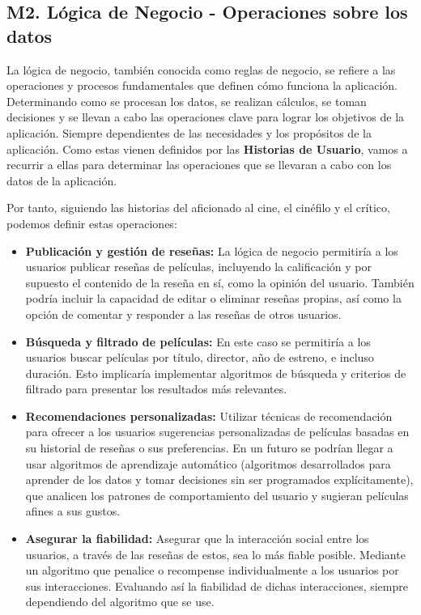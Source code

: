 \subsection{M2. Lógica de Negocio - Operaciones sobre los datos}

La lógica de negocio, también conocida como reglas de negocio, se refiere a las operaciones y procesos fundamentales que definen cómo funciona la aplicación. Determinando como se procesan los datos, se realizan cálculos, se toman decisiones y se llevan a cabo las operaciones clave para lograr los objetivos de la aplicación. Siempre dependientes de las necesidades y los propósitos de la aplicación. Como estas vienen definidos por las \textbf{Historias de Usuario}, vamos a recurrir a ellas para determinar las operaciones que se llevaran a cabo con los datos de la aplicación. 

Por tanto, siguiendo las historias del aficionado al cine, el cinéfilo y el crítico, podemos definir estas operaciones:

\begin{itemize}
\item \textbf{Publicación y gestión de reseñas:} La lógica de negocio permitiría a los usuarios publicar reseñas de películas, incluyendo la calificación y por supuesto el contenido de la reseña en sí, como la opinión del usuario. También podría incluir la capacidad de editar o eliminar reseñas propias, así como la opción de comentar y responder a las reseñas de otros usuarios.
\item \textbf{Búsqueda y filtrado de películas:} En este caso se permitiría a los usuarios buscar películas por título, director, año de estreno, e incluso duración. Esto implicaría implementar algoritmos de búsqueda y criterios de filtrado para presentar los resultados más relevantes. 
\item \textbf{Recomendaciones personalizadas:} Utilizar técnicas de recomendación para ofrecer a los usuarios sugerencias personalizadas de películas basadas en su historial de reseñas o sus preferencias. En un futuro se podrían llegar a usar algoritmos de aprendizaje automático (algoritmos desarrollados para aprender de los datos y tomar decisiones sin ser programados explícitamente), que analicen los patrones de comportamiento del usuario y sugieran películas afines a sus gustos.
\item \textbf{Asegurar la fiabilidad:} Asegurar que la interacción social entre los usuarios, a través de las reseñas de estos, sea lo más fiable posible. Mediante un algoritmo que penalice o recompense individualmente a los usuarios por sus interacciones. Evaluando así la fiabilidad de dichas interacciones, siempre dependiendo del algoritmo que se use.
\end{itemize}


